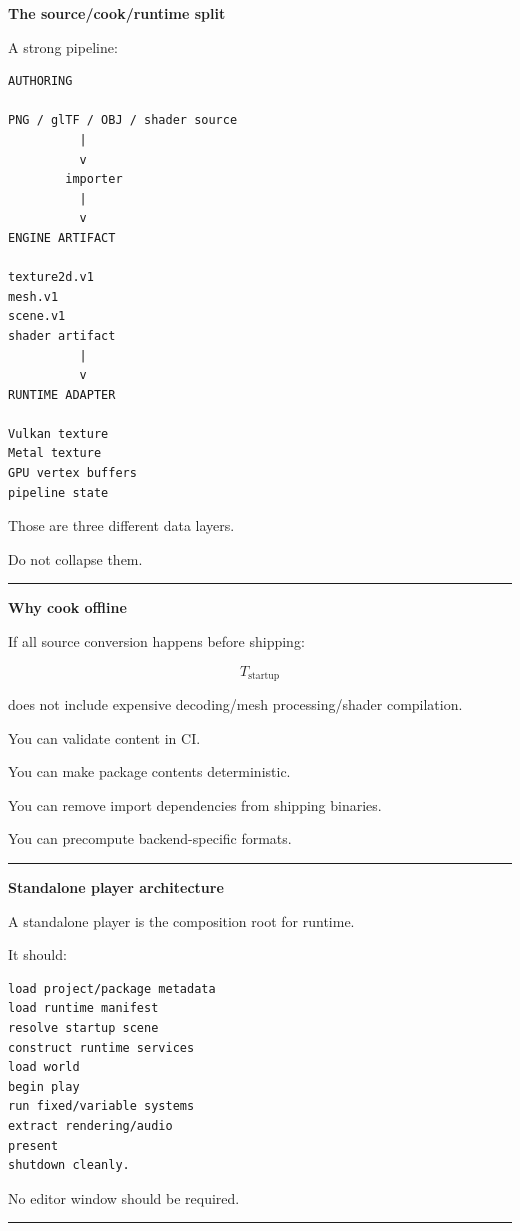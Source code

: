 \textbf{The source/cook/runtime split}

A strong pipeline:

\begin{verbatim}
AUTHORING

PNG / glTF / OBJ / shader source
          |
          v
        importer
          |
          v
ENGINE ARTIFACT

texture2d.v1
mesh.v1
scene.v1
shader artifact
          |
          v
RUNTIME ADAPTER

Vulkan texture
Metal texture
GPU vertex buffers
pipeline state
\end{verbatim}

Those are three different data layers.

Do not collapse them.

\begin{center}\rule{0.5\linewidth}{0.5pt}\end{center}

\textbf{Why cook offline}

If all source conversion happens before shipping:

\[
T_{\text{startup}}
\]

does not include expensive decoding/mesh processing/shader compilation.

You can validate content in CI.

You can make package contents deterministic.

You can remove import dependencies from shipping binaries.

You can precompute backend-specific formats.

\begin{center}\rule{0.5\linewidth}{0.5pt}\end{center}

\textbf{Standalone player architecture}

A standalone player is the composition root for runtime.

It should:

\begin{verbatim}
load project/package metadata
load runtime manifest
resolve startup scene
construct runtime services
load world
begin play
run fixed/variable systems
extract rendering/audio
present
shutdown cleanly.
\end{verbatim}

No editor window should be required.

\begin{center}\rule{0.5\linewidth}{0.5pt}\end{center}

